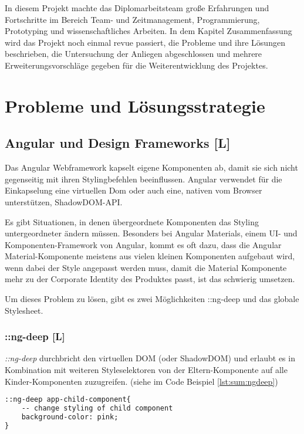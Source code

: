 In diesem Projekt machte das Diplomarbeitsteam große Erfahrungen und Fortschritte im Bereich Team- und Zeitmanagement, Programmierung, Prototyping und wissenschaftliches Arbeiten. In dem Kapitel Zusammenfassung wird das Projekt noch einmal revue passiert, die Probleme und ihre Lösungen beschrieben, die Untersuchung der Anliegen abgeschlossen und mehrere Erweiterungsvorschläge gegeben für die Weiterentwicklung des Projektes.

\section{Probleme und Lösungsstrategie}
\subsection{Angular und Design Frameworks [L]}
Das Angular Webframework kapselt eigene Komponenten ab, damit sie sich nicht gegenseitig mit ihren Stylingbefehlen beeinflussen. Angular verwendet für die Einkapselung eine virtuellen Dom oder auch eine, nativen vom Browser unterstützen, ShadowDOM-API.
\cite{AngularViewencapsulation}

Es gibt Situationen, in denen übergeordnete Komponenten das Styling untergeordneter ändern müssen. Besonders bei Angular Materials, einem UI- und Komponenten-Framework von Angular, kommt es oft dazu, dass die Angular Material-Komponente meistens aus vielen kleinen Komponenten aufgebaut wird, wenn dabei der Style angepasst werden muss, damit die Material Komponente mehr zu der Corporate Identity des Produktes passt, ist das schwierig umsetzen.

Um dieses Problem zu lösen, gibt es zwei Möglichkeiten ::ng-deep und das globale Stylesheet.

\subsubsection{::ng-deep [L]}
\emph{::ng-deep} durchbricht den virtuellen DOM (oder ShadowDOM) und erlaubt es in Kombination mit weiteren Styleselektoren von der Eltern-Komponente auf alle Kinder-Komponenten zuzugreifen. (siehe im Code Beispiel \ref{lst:sum:ngdeep})

\begin{lstlisting}[caption={{Parent.component.scss - Changing Styling in Child Componentes by using :ngdeep}},language=HTML,label=lst:sum:ngdeep]
::ng-deep app-child-component{
    -- change styling of child component
    background-color: pink;
}    
\end{lstlisting}

